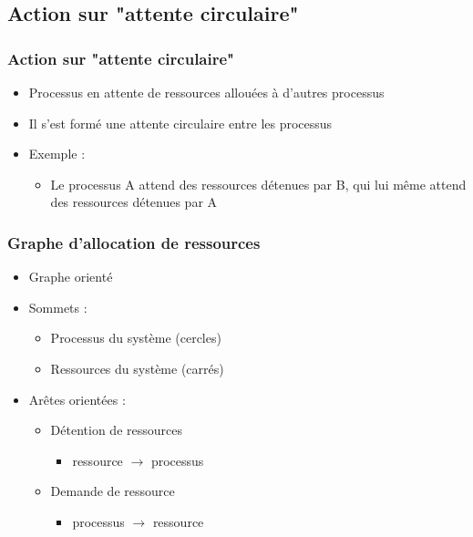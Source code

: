 \subsection{Action sur "attente circulaire"}

\begin{frame}
\frametitle{Action sur "attente circulaire"}
\begin{itemize}
\item Processus en attente de ressources allouées à d’autres processus
\item Il s’est formé une attente circulaire entre les processus
\item Exemple :
\begin{itemize}
\item Le processus A attend des ressources détenues par B, qui lui même attend des ressources détenues par A
\end{itemize}
\end{itemize}
\end{frame}

\begin{frame}
\frametitle{Graphe d’allocation de ressources}
\begin{itemize}
\item <1-> Graphe orienté
\item <2-> Sommets :
\begin{itemize}
\item Processus du système (cercles)
\item Ressources du système (carrés)
\end{itemize}
\item <3-> Arêtes orientées :
\begin{itemize}
\item Détention de ressources
\begin{itemize}
\item ressource $\to$ processus
\end{itemize}
\item Demande de ressource
\begin{itemize}
\item processus $\to$ ressource
\end{itemize}
\end{itemize}
\end{itemize}
\end{frame}

